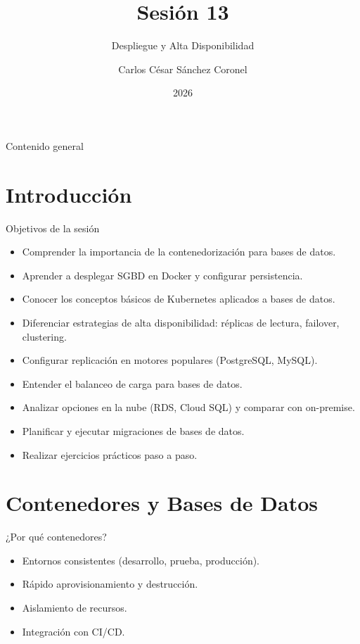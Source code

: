 \documentclass[aspectratio=169, 10pt, xcolor=table]{beamer}
\title[SESIÓN 13 BBDD]{\textbf{Sesión 13}}
\subtitle{Despliegue y Alta Disponibilidad}
\author[Prof. C. Sánchez]{Carlos César Sánchez Coronel}
\institute{\textbf{BASES DE DATOS}}
\date{2026}
\begin{document}
\begin{frame}
    \titlepage
\end{frame}

\begin{frame}{Contenido general}
    \tableofcontents
\end{frame}

\section{Introducción}

\begin{frame}{Objetivos de la sesión}
    \begin{itemize}
        \item Comprender la importancia de la contenedorización para bases de datos.
        \item Aprender a desplegar SGBD en Docker y configurar persistencia.
        \item Conocer los conceptos básicos de Kubernetes aplicados a bases de datos.
        \item Diferenciar estrategias de alta disponibilidad: réplicas de lectura, failover, clustering.
        \item Configurar replicación en motores populares (PostgreSQL, MySQL).
        \item Entender el balanceo de carga para bases de datos.
        \item Analizar opciones en la nube (RDS, Cloud SQL) y comparar con on-premise.
        \item Planificar y ejecutar migraciones de bases de datos.
        \item Realizar ejercicios prácticos paso a paso.
    \end{itemize}
\end{frame}

\section{Contenedores y Bases de Datos}

\begin{frame}{¿Por qué contenedores?}
    \begin{itemize}
        \item Entornos consistentes (desarrollo, prueba, producción).
        \item Rápido aprovisionamiento y destrucción.
        \item Aislamiento de recursos.
        \item Integración con CI/CD.
    \end{itemize}
\end{frame}
\end{document}
